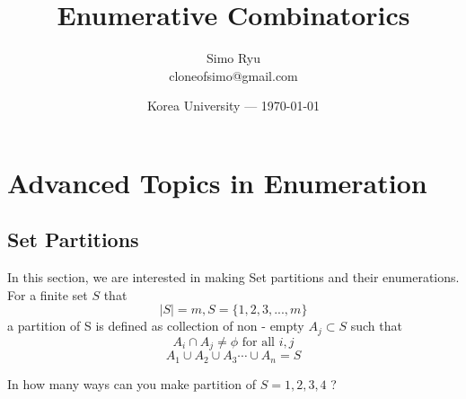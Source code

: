 \documentclass[12pt]{article}
\title{Enumerative Combinatorics}
\author{Simo Ryu \\ cloneofsimo@gmail.com}
\date{Korea University --- \today}
\begin{document}
\maketitle

\section{Advanced Topics in Enumeration}

\subsection{Set Partitions}

In this section, we are interested in making Set partitions and their enumerations.
For a finite set $S$ that  $$ |S| = m , S = \{ 1,2,3,...,m\}$$
a partition of S is defined as collection of non - empty $A_j \subset S$
such that \begin{equation}
A_i \cap A_j \neq \phi \text{ for all $i,j$}
\end{equation}
\begin{equation}
  A_1 \cup A_2 \cup A_3 \cdots \cup A_n = S
\end{equation}

 In how many ways can you make partition of $S = {1,2,3,4}$ ?
\end{document}
